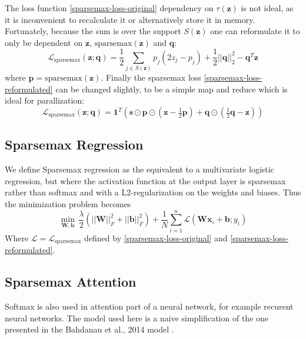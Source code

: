 The loss function \eqref{sparsemax-loss-original} dependency on $\tau(\mathbf{z})$ is not ideal, as it is inconvenient to recalculate it or alternatively store it in memory. Fortunately, because the sum is over the support $S(\mathbf{z})$ one can reformulate it to only be dependent on $\mathbf{z}$, $\mathrm{sparsemax}(\mathbf{z})$ and $\mathbf{q}$:
\begin{equation}
\mathcal{L}_{\mathrm{sparsemax}}(\mathbf{z}; \mathbf{q}) = \frac{1}{2} \sum_{j \in S(\mathbf{z})} p_j (2 z_j - p_j) + \frac{1}{2} ||\mathbf{q}||_2^2 - \mathbf{q}^T \mathbf{z}
\label{sparsemax-loss-reformulated}
\end{equation}
where $\mathbf{p} = \mathrm{sparsemax}(\mathbf{z})$. Finally the sparsemax loss \eqref{sparsemax-loss-reformulated} can be changed slightly, to be a simple map and reduce which is ideal for parallization:
\begin{equation}
\mathcal{L}_{\mathrm{sparsemax}}(\mathbf{z}; \mathbf{q}) = \mathbf{1}^T \left( \mathbf{s} \odot \mathbf{p} \odot \left(\mathbf{z} - \tfrac{1}{2} \mathbf{p}\right) + \mathbf{q} \odot \left(\tfrac{1}{2} \mathbf{q} - \mathbf{z}\right)\right)
\end{equation}

\subsection{Sparsemax Regression}
We define Sparsemax regression as the equivalent to a multivariate logistic regression, but where the activation function at the output layer is sparsemax rather than softmax and with a L2-regularization on the weights and biases. Thus the minimization problem becomes
\begin{equation}
\min_{\mathbf{W},\mathbf{b}} \, \frac{\lambda}{2} (||\mathbf{W}||^2_{F} + ||\mathbf{b}||^2_{F}) + \frac{1}{N} \sum\limits_{i=1}^n \mathcal{L} (\mathbf{W} \mathbf{x}_i + \mathbf{b}; y_i)
\label{sparsemax-regression}
\end{equation}
Where $\mathcal{L} = \mathcal{L}_{\mathrm{sparsemax}}$ defined by \eqref{sparsemax-loss-original} and \eqref{sparsemax-loss-reformulated}.

\subsection{Sparsemax Attention}
Softmax is also used in attention part of a neural network, for example recurent neural networks. The model used here is a naive simplification of the one presented in the Bahdanau et al., 2014 model \cite{attention}.

